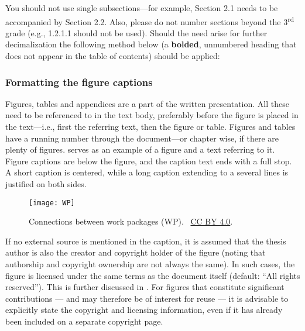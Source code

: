 You should not use single subsections---for example, Section 2.1
needs to be accompanied by Section 2.2. Also, please do not number
sections beyond the 3\textsuperscript{rd}  grade (e.g., 1.2.1.1
should not be used). Should the need arise for further decimalization
the following method below (a \textbf{bolded}, unnumbered heading
that does not appear in the table of contents) should be applied:

\subsubsection{Formatting the figure captions}
Figures, tables and appendices are a part of the written
presentation. All these need to be referenced to in the text body,
preferably before the figure is placed in the text---i.e., first the
referring text, then the figure or table. Figures and tables have a
running number through the document---or chapter wise, if there are
plenty of figures.  serves as an example of a figure and a
text referring to it. Figure captions are below the figure, and the
caption text ends with a full stop. A short caption is centered,
while a long caption extending to a several lines is justified on both sides.

\begin{figure}[ht]
\begin{center}
  \texttt{[image: WP]}
\end{center}
\caption{Connections between work packages (WP).
  \copyrightstring\ \href{https://creativecommons.org/licenses/by/4.0/}{CC
BY 4.0}.}
\label{fig:work_packages}
\end{figure}

If no external source is mentioned in the caption, it is assumed that
the thesis author is also the creator and copyright holder of the
figure (noting that authorship and copyright ownership are not always
the same). In such cases, the figure is licensed under the same terms
as the document itself (default: “All rights reserved”). This is
further discussed in . For figures that constitute
significant contributions — and may therefore be of interest for
reuse — it is advisable to explicitly state the copyright and
licensing information, even if it has already been included on a separate
copyright page.

